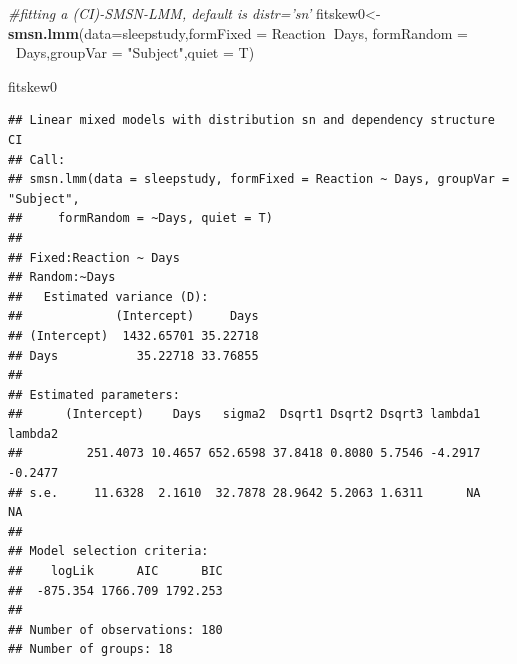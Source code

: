 \documentclass[
  ignorenonframetext,
]{beamer}
\newenvironment{Shaded}{\begin{snugshade}}{\end{snugshade}}
\newcommand{\CommentTok}[1]{\textcolor[rgb]{0.56,0.35,0.01}{\textit{#1}}}
\newcommand{\DataTypeTok}[1]{\textcolor[rgb]{0.13,0.29,0.53}{#1}}
\newcommand{\KeywordTok}[1]{\textcolor[rgb]{0.13,0.29,0.53}{\textbf{#1}}}
\newcommand{\NormalTok}[1]{#1}
\newcommand{\OperatorTok}[1]{\textcolor[rgb]{0.81,0.36,0.00}{\textbf{#1}}}
\newcommand{\StringTok}[1]{\textcolor[rgb]{0.31,0.60,0.02}{#1}}
\begin{document}
\begin{frame}[fragile]

\tiny

\begin{Shaded}
\begin{Highlighting}[]
\CommentTok{#fitting a (CI)-SMSN-LMM, default is distr='sn'}
\NormalTok{fitskew0<-}\KeywordTok{smsn.lmm}\NormalTok{(}\DataTypeTok{data=}\NormalTok{sleepstudy,}\DataTypeTok{formFixed =}\NormalTok{ Reaction}\OperatorTok{~}\NormalTok{Days,}
              \DataTypeTok{formRandom =} \OperatorTok{~}\NormalTok{Days,}\DataTypeTok{groupVar =} \StringTok{"Subject"}\NormalTok{,}\DataTypeTok{quiet =}\NormalTok{ T)}
\end{Highlighting}
\end{Shaded}

\begin{Shaded}
\begin{Highlighting}[]
\NormalTok{fitskew0}
\end{Highlighting}
\end{Shaded}

\begin{verbatim}
## Linear mixed models with distribution sn and dependency structure CI 
## Call:
## smsn.lmm(data = sleepstudy, formFixed = Reaction ~ Days, groupVar = "Subject", 
##     formRandom = ~Days, quiet = T)
## 
## Fixed:Reaction ~ Days
## Random:~Days
##   Estimated variance (D):
##             (Intercept)     Days
## (Intercept)  1432.65701 35.22718
## Days           35.22718 33.76855
## 
## Estimated parameters:
##      (Intercept)    Days   sigma2  Dsqrt1 Dsqrt2 Dsqrt3 lambda1 lambda2
##         251.4073 10.4657 652.6598 37.8418 0.8080 5.7546 -4.2917 -0.2477
## s.e.     11.6328  2.1610  32.7878 28.9642 5.2063 1.6311      NA      NA
## 
## Model selection criteria:
##    logLik      AIC      BIC
##  -875.354 1766.709 1792.253
## 
## Number of observations: 180 
## Number of groups: 18
\end{verbatim}

\end{frame}
\end{document}

